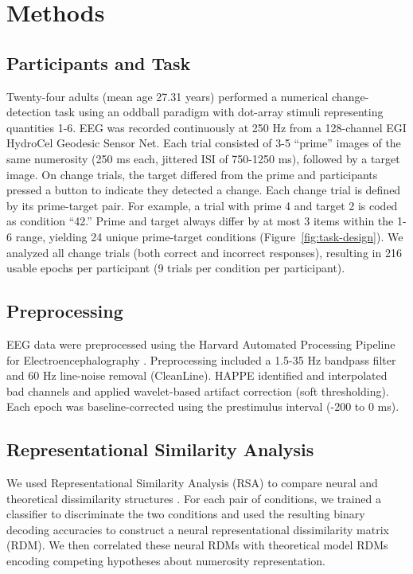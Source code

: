 \section{Methods}

\subsection{Participants and Task}
Twenty-four adults (mean age 27.31 years) performed a numerical
change-detection task using an oddball paradigm with dot-array stimuli
representing quantities 1-6. EEG was recorded continuously at 250 Hz
from a 128-channel EGI HydroCel Geodesic Sensor Net.
Each trial consisted of 3-5 ``prime'' images of the same numerosity
(250 ms each, jittered ISI of 750-1250 ms), followed by a target
image. On change trials, the target differed from the prime and
participants pressed a button to indicate they detected a change.
Each change trial is defined by its prime-target pair. For example,
a trial with prime 4 and target 2 is coded as condition ``42.''
Prime and target always differ by at most 3 items within the 1-6
range, yielding 24 unique prime-target conditions
(Figure~\ref{fig:task-design}). We analyzed all change trials
(both correct and incorrect responses), resulting in 216 usable
epochs per participant (9 trials per condition per participant).



\subsection{Preprocessing}
EEG data were preprocessed using the Harvard Automated Processing Pipeline
for Electroencephalography \citep[HAPPE v4.1.0;][]{GabardDurnam2018HAPPE}.
Preprocessing included a 1.5-35 Hz bandpass filter and 60 Hz line-noise
removal (CleanLine). HAPPE identified and interpolated bad
channels and applied wavelet-based artifact correction (soft
thresholding).
Each epoch was baseline-corrected using the prestimulus interval
(-200 to 0 ms).

\subsection{Representational Similarity Analysis}
We used Representational Similarity Analysis (RSA) to compare neural
and theoretical dissimilarity structures \citep{Kriegeskorte2008}.
For each pair of conditions, we trained a classifier to discriminate
the two conditions and used the resulting binary decoding accuracies to construct
a neural representational dissimilarity matrix (RDM). We then correlated these neural RDMs with
theoretical model RDMs encoding competing hypotheses about numerosity
representation.

